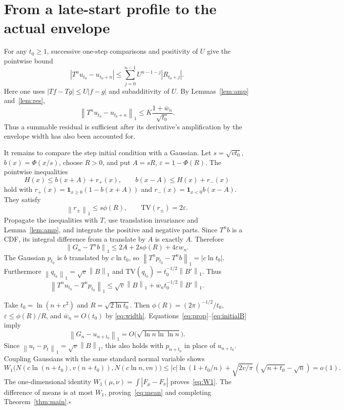 \documentclass[11pt]{article}
\newcommand{\TV}{\mathrm{TV}}
\newcommand{\norm}[1]{\left\|#1\right\|_1}
\begin{document}
\section{From a late-start profile to the actual envelope}
For any $t_0\ge1$, successive one-step comparisons and positivity of $U$
give the pointwise bound
\[
 |T^nu_{t_0}-u_{t_0+n}|
 \le\sum_{j=0}^{n-1}U^{n-1-j}|R_{t_0+j}|.
\]
Here one uses $|Tf-Tg|\le U|f-g|$ and subadditivity of $U$.
By Lemmas~\ref{lem:amp} and~\ref{lem:res},
\begin{equation}\label{eq:prop}
 \norm{T^nu_{t_0}-u_{t_0+n}}
 \le K\frac{1+\bar w_n}{\sqrt{t_0}}.
\end{equation}
Thus a summable residual is sufficient after its derivative's
amplification by the envelope width has also been accounted for.

It remains to compare the step initial condition with a Gaussian.
Let $s=\sqrt{vt_0}$, $b(x)=\Phi(x/s)$, choose $R>0$, and put
$A=sR$, $\varepsilon=1-\Phi(R)$. The pointwise inequalities
\[
 H(x)\le b(x+A)+r_+(x),\qquad
 b(x-A)\le H(x)+r_-(x)
\]
hold with
$r_+(x)=\mathbf1_{x\ge0}(1-b(x+A))$ and
$r_-(x)=\mathbf1_{x<0}b(x-A)$.
They satisfy
\[
 \norm{r_\pm}\le s\phi(R),\qquad \TV(r_\pm)=2\varepsilon.
\]
Propagate the inequalities with $T$, use translation invariance and
Lemma~\ref{lem:amp}, and integrate the positive and negative parts.
Since $T^nb$ is a CDF, its integral difference from a translate by $A$
is exactly $A$. Therefore
\begin{equation}\label{eq:initial}
 \norm{G_n-T^nb}\le2A+2s\phi(R)+4\varepsilon w_n.
\end{equation}
The Gaussian $p_{t_0}$ is $b$ translated by $c\ln t_0$, so
$\norm{T^np_{t_0}-T^nb}=|c\ln t_0|$.
Furthermore $\norm{q_{t_0}}=\sqrt v\norm{B}$ and
$\TV(q_{t_0})=t_0^{-1/2}\norm{B'}$. Thus
\begin{equation}\label{eq:initialB}
 \norm{T^nu_{t_0}-T^np_{t_0}}
 \le \sqrt v\norm B+w_n t_0^{-1/2}\norm{B'}.
\end{equation}

Take $t_0=\ln(n+e^2)$ and $R=\sqrt{2\ln t_0}$.
Then $\phi(R)=(2\pi)^{-1/2}/t_0$,
$\varepsilon\le\phi(R)/R$, and $\bar w_n=O(t_0)$ by
\eqref{eq:width}. Equations~\eqref{eq:prop}--\eqref{eq:initialB} imply
\begin{equation}\label{eq:last}
 \norm{G_n-u_{n+t_0}}
 =O\bigl(\sqrt{\ln n\ln\ln n}\bigr).
\end{equation}
Since $\norm{u_t-p_t}=\sqrt v\norm B$, this also holds with
$p_{n+t_0}$ in place of $u_{n+t_0}$.
Coupling Gaussians with the same standard normal variable shows
\[
 W_1\bigl(N(c\ln(n+t_0),v(n+t_0)),N(c\ln n,vn)\bigr)
 \le |c|\ln(1+t_0/n)
 +\sqrt{2v/\pi}\,(\sqrt{n+t_0}-\sqrt n)=o(1).
\]
The one-dimensional identity $W_1(\mu,\nu)=\int|F_\mu-F_\nu|$
proves~\eqref{eq:W1}. The difference of means is at most $W_1$,
proving~\eqref{eq:mean} and completing Theorem~\ref{thm:main}.\hfill$\square$
\end{document}

